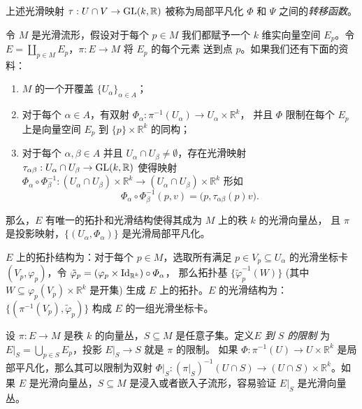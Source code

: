 上述光滑映射 $\tau:U\cap V\to\operatorname{GL}(k,\mathbb{R})$ 被称为局部平凡化
$\varPhi$ 和 $\varPsi$ 之间的\emph{转移函数}。

\begin{lemma}[向量丛坐标卡引理]
  令 $M$ 是光滑流形，假设对于每个 $p\in M$ 我们都赋予一个 $k$ 维实向量空间
  $E_p$。令 $E=\coprod_{p\in M}E_p$，$\pi:E\to M$ 将 $E_p$ 的每个元素
  送到点 $p$。如果我们还有下面的资料：
  \begin{enumerate}
    \item $M$ 的一个开覆盖 $\{U_\alpha\}_{\alpha\in A}$；
    \item 对于每个 $\alpha\in A$，有双射 $\varPhi_\alpha:\pi^{-1}(U_\alpha)\to U_\alpha\times \mathbb{R}^k$，
    并且 $\varPhi$ 限制在每个 $E_p$ 上是向量空间 $E_p$ 到 $\{p\}\times \mathbb{R}^k$ 的同构；
    \item 对于每个 $\alpha,\beta\in A$ 并且 $U_\alpha\cap U_\beta\neq\emptyset$，存在光滑映射
    $\tau_{\alpha\beta}:U_\alpha\cap U_\beta\to \operatorname{GL}(k,\mathbb{R})$ 使得映射
    $\varPhi_\alpha\circ\varPhi_\beta^{-1}:(U_\alpha\cap U_\beta)\times \mathbb{R}^k\to (U_\alpha\cap U_\beta)\times \mathbb{R}^k$
    形如
    \[
      \varPhi_\alpha\circ\varPhi_\beta^{-1}(p,v)=\bigl(p,\tau_{\alpha\beta}(p)v\bigr).  
    \]
  \end{enumerate}
  那么，$E$ 有唯一的拓扑和光滑结构使得其成为 $M$ 上的秩 $k$ 的光滑向量丛，
  且 $\pi$ 是投影映射，$\{(U_\alpha,\varPhi_\alpha)\}$ 是光滑局部平凡化。
\end{lemma}

\begin{remark}
  $E$ 上的拓扑结构为：对于每个 $p\in M$，选取所有满足 $p\in V_p\subseteq U_\alpha$
  的光滑坐标卡 $(V_p,\varphi_p)$，令 $\tilde\varphi_p=(\varphi_p\times \operatorname{Id}_{\mathbb{R}^k})\circ\varPhi_\alpha$，
  那么拓扑基 $\{\tilde\varphi_p^{-1}(W)\}$ (其中 $W\subseteq \varphi_p(V_p)\times \mathbb{R}^k$ 是开集)
  生成 $E$ 上的拓扑。$E$ 的光滑结构为：$\{(\pi^{-1}(V_p),\tilde\varphi_p)\}$
  构成 $E$ 的一组光滑坐标卡。
\end{remark} 


\begin{example}[向量丛的限制]
  设 $\pi:E\to M$ 是秩 $k$ 的向量丛，$S\subseteq M$ 是任意子集。定义\emph{$E$ 到 $S$ 的限制}
  为 $E|_S=\bigcup_{p\in S}E_p$，投影 $E|_S\to S$ 就是 $\pi$ 的限制。
  如果 $\varPhi:\pi^{-1}(U)\to U\times \mathbb{R}^k$ 是局部平凡化，那么其可以限制为双射
  $\varPhi|_S:(\pi|_S)^{-1}(U\cap S)\to (U\cap S)\times \mathbb{R}^k$。如果 $E$
  是光滑向量丛，$S\subseteq M$ 是浸入或者嵌入子流形，容易验证 $E|_S$ 是光滑向量丛。
\end{example}

